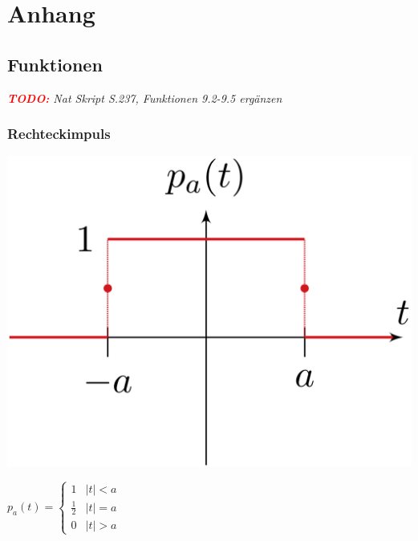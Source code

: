 \section{Anhang}



	\subsection{Funktionen}
			\textit{\textcolor{red}{\textbf{TODO:}} Nat Skript S.237, Funktionen 9.2-9.5 ergänzen}\\
	
	
		\subsubsection{Rechteckimpuls}
			\begin{minipage}{0.2\textwidth}
				\includegraphics[width=\textwidth]{./bilder/funktionen/rechteckF.png}
			\end{minipage}
			\qquad
			\begin{minipage}{0.45\textwidth}
				$p_{a}(t)=\begin{cases}
				1 & |t|<a \\ 
				\frac{1}{2} & |t|=a \\ 
				0 & |t|>a
				\end{cases}$
			\end{minipage}
			\qquad
			\begin{minipage}{0.25\textwidth}						
			\end{minipage}
		
